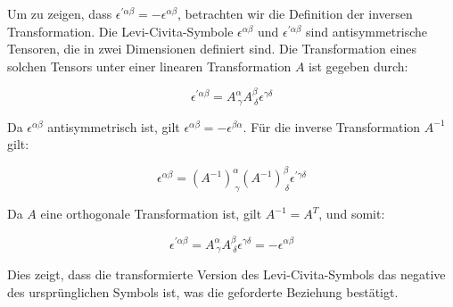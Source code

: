 Um zu zeigen, dass $\epsilon^{\prime \alpha \beta} = -\epsilon^{\alpha \beta}$, betrachten wir die Definition der inversen Transformation. Die Levi-Civita-Symbole $\epsilon^{\alpha \beta}$ und $\epsilon^{\prime \alpha \beta}$ sind antisymmetrische Tensoren, die in zwei Dimensionen definiert sind. Die Transformation eines solchen Tensors unter einer linearen Transformation $A$ ist gegeben durch:

\[
\epsilon^{\prime \alpha \beta} = A^\alpha_{\ \gamma} A^\beta_{\ \delta} \epsilon^{\gamma \delta}
\]

Da $\epsilon^{\alpha \beta}$ antisymmetrisch ist, gilt $\epsilon^{\alpha \beta} = -\epsilon^{\beta \alpha}$. Für die inverse Transformation $A^{-1}$ gilt:

\[
\epsilon^{\alpha \beta} = (A^{-1})^\alpha_{\ \gamma} (A^{-1})^\beta_{\ \delta} \epsilon^{\prime \gamma \delta}
\]

Da $A$ eine orthogonale Transformation ist, gilt $A^{-1} = A^T$, und somit:

\[
\epsilon^{\prime \alpha \beta} = A^\alpha_{\ \gamma} A^\beta_{\ \delta} \epsilon^{\gamma \delta} = -\epsilon^{\alpha \beta}
\]

Dies zeigt, dass die transformierte Version des Levi-Civita-Symbols das negative des ursprünglichen Symbols ist, was die geforderte Beziehung bestätigt.
